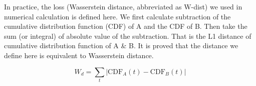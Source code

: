 In practice, the loss (Wasserstein distance, abbreviated as W-dist) we used in numerical calculation is defined here. We first calculate subtraction of the cumulative distribution function (CDF) of A and the CDF of B. Then take the sum (or integral) of absolute value of the subtraction. That is the L1 distance of cumulative distribution function of A \& B. It is proved that the distance we define here is equivalent to Wasserstein distance. 

\begin{equation}
    W_{d}=\sum_t|\mathrm{CDF}_A(t) - \mathrm{CDF}_B(t)|
\end{equation}
